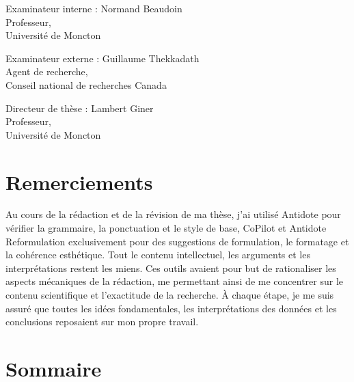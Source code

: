 \documentclass[superscriptaddress,12pt]{article}
\newcommand\tab[1][0.83cm]{\hspace*{#1}}
\begin{document}
    Examinateur interne : Normand Beaudoin \\
    \tab \tab Professeur, \\
    \tab \tab Université de Moncton


    \vspace{3cm}


    Examinateur externe : Guillaume Thekkadath \\
    \tab \tab Agent de recherche, \\
    \tab \tab Conseil national de recherches Canada


    \vspace{3cm}


    Directeur de thèse : Lambert Giner \\
    \tab \tab Professeur, \\
    \tab \tab Université de Moncton


    \pagebreak


    \section*{Remerciements}

    
    \pagebreak

    \guillemetleft Au cours de la rédaction et de la révision de ma thèse, j'ai utilisé Antidote pour vérifier la grammaire, la
    ponctuation et le style de base, CoPilot et Antidote Reformulation exclusivement pour des suggestions de formulation, le
    formatage et la cohérence esthétique. Tout le contenu intellectuel, les arguments et les interprétations restent les miens. Ces outils avaient pour but de rationaliser les aspects mécaniques de la
    rédaction, me permettant ainsi de me concentrer sur le contenu scientifique et l'exactitude de la recherche. À chaque
    étape, je me suis assuré que toutes les idées fondamentales, les interprétations des données
    et les conclusions reposaient sur mon propre travail. \guillemetright

    \pagebreak

    \section*{Sommaire}

    
    
\end{document}
